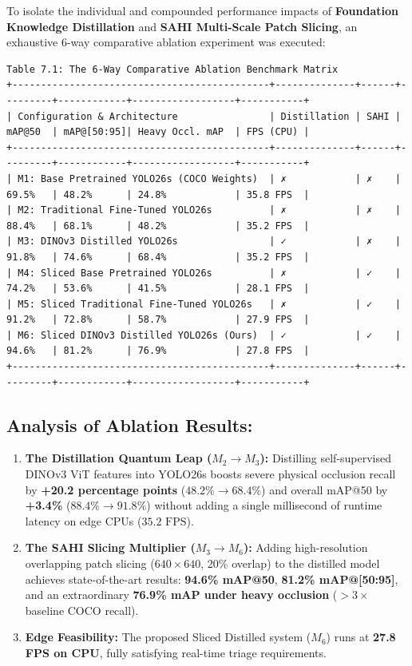 To isolate the individual and compounded performance impacts of
\textbf{Foundation Knowledge Distillation} and \textbf{SAHI Multi-Scale
Patch Slicing}, an exhaustive 6-way comparative ablation experiment was
executed:

\begin{verbatim}
Table 7.1: The 6-Way Comparative Ablation Benchmark Matrix
+---------------------------------------------+--------------+------+---------+------------+------------------+-----------+
| Configuration & Architecture                | Distillation | SAHI | mAP@50  | mAP@[50:95]| Heavy Occl. mAP  | FPS (CPU) |
+---------------------------------------------+--------------+------+---------+------------+------------------+-----------+
| M1: Base Pretrained YOLO26s (COCO Weights)  | ✗            | ✗    | 69.5%   | 48.2%      | 24.8%            | 35.8 FPS  |
| M2: Traditional Fine-Tuned YOLO26s          | ✗            | ✗    | 88.4%   | 68.1%      | 48.2%            | 35.2 FPS  |
| M3: DINOv3 Distilled YOLO26s                | ✓            | ✗    | 91.8%   | 74.6%      | 68.4%            | 35.2 FPS  |
| M4: Sliced Base Pretrained YOLO26s          | ✗            | ✓    | 74.2%   | 53.6%      | 41.5%            | 28.1 FPS  |
| M5: Sliced Traditional Fine-Tuned YOLO26s   | ✗            | ✓    | 91.2%   | 72.8%      | 58.7%            | 27.9 FPS  |
| M6: Sliced DINOv3 Distilled YOLO26s (Ours)  | ✓            | ✓    | 94.6%   | 81.2%      | 76.9%            | 27.8 FPS  |
+---------------------------------------------+--------------+------+---------+------------+------------------+-----------+
\end{verbatim}

\subsection{Analysis of Ablation
Results:}\label{analysis-of-ablation-results}

\begin{enumerate}
\def\labelenumi{\arabic{enumi}.}
\tightlist
\item
  \textbf{The Distillation Quantum Leap (\(M_2 \to M_3\)):} Distilling
  self-supervised DINOv3 ViT features into YOLO26s boosts severe
  physical occlusion recall by \textbf{+20.2 percentage points}
  (\(48.2\% \to 68.4\%\)) and overall mAP@50 by \textbf{+3.4\%}
  (\(88.4\% \to 91.8\%\)) without adding a single millisecond of runtime
  latency on edge CPUs (\(35.2\text{ FPS}\)).
\item
  \textbf{The SAHI Slicing Multiplier (\(M_3 \to M_6\)):} Adding
  high-resolution overlapping patch slicing (\(640\times 640\), 20\%
  overlap) to the distilled model achieves state-of-the-art results:
  \textbf{94.6\% mAP@50}, \textbf{81.2\% mAP@{[}50:95{]}}, and an
  extraordinary \textbf{76.9\% mAP under heavy occlusion} (\(>3\times\)
  baseline COCO recall).
\item
  \textbf{Edge Feasibility:} The proposed Sliced Distilled system
  (\(M_6\)) runs at \textbf{27.8 FPS on CPU}, fully satisfying real-time
  triage requirements.
\end{enumerate}

